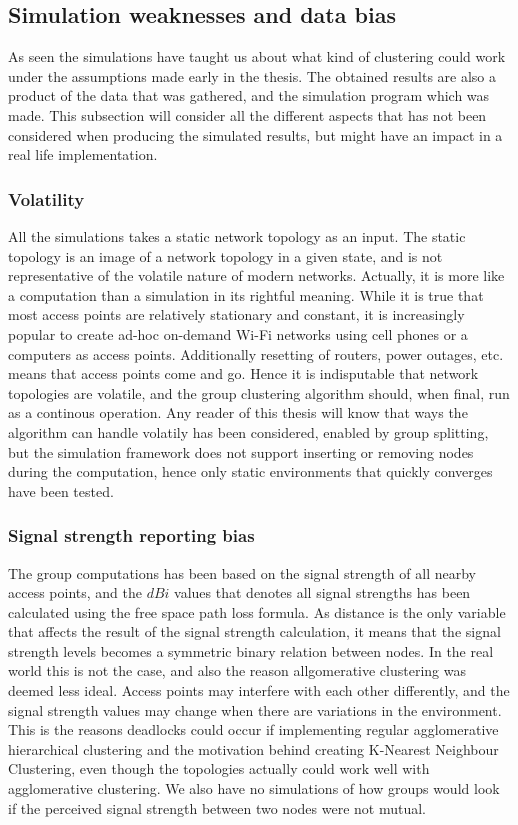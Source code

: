 \subsection{Simulation weaknesses and data bias}
As seen the simulations have taught us about what kind of clustering could work under the assumptions made early in the thesis. The obtained results are also 
a product of the data that was gathered, and the simulation program which was made. This subsection will consider all the different aspects that has not been considered
when producing the simulated results, but might have an impact in a real life implementation. 

\subsubsection{Volatility} 
All the simulations takes a static network topology as an input. The static topology is an image of a network topology in a given state, and is not representative
of the volatile nature of modern networks. Actually, it is more like a computation than a simulation in its rightful meaning.
While it is true that most access points are relatively stationary and constant, it is increasingly popular to create ad-hoc on-demand Wi-Fi
networks using cell phones or a computers as access points. Additionally resetting of routers, power outages, etc. means that access points come and go. 
Hence it is indisputable that network topologies are volatile, and the group clustering algorithm should, when final, run as a continous operation. 
Any reader of this thesis will know that ways the algorithm can handle volatily has been considered, enabled by group splitting,
but the simulation framework does not support inserting or removing nodes during the computation, hence only static environments that quickly converges have been tested. 

\subsubsection{Signal strength reporting bias}
The group computations has been based on the signal strength of all nearby access points, and the $dBi$ values that denotes all signal strengths has been calculated using the
free space path loss formula. As distance is the only variable that affects the result of the signal strength calculation,
it means that the signal strength levels becomes a symmetric binary relation between nodes. In the real world this is not the case, and also the reason allgomerative clustering was deemed
less ideal. Access points may interfere with each other differently, and the signal strength values may change when there are variations in the environment. This is the reasons deadlocks could
occur if implementing regular agglomerative hierarchical clustering and the motivation behind creating K-Nearest Neighbour Clustering, even though the topologies actually
could work well with agglomerative clustering. We also have no simulations of how groups would look if the perceived signal strength between two nodes were not mutual.

